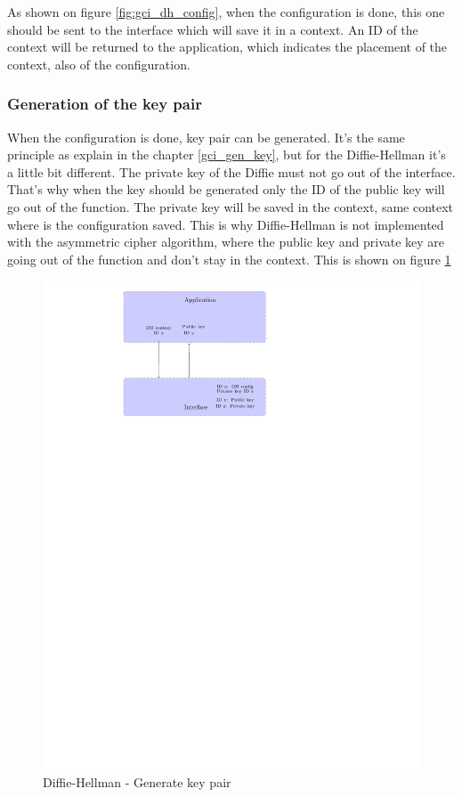 As shown on figure \ref{fig:gci_dh_config}, when the configuration is done, this
one should be sent to the interface which will save it in a context.
An ID of the context will be returned to the application, which indicates the
placement of the context, also of the configuration.


\subsubsection*{Generation of the key pair}

When the configuration is done, key pair can be generated. It's the same
principle as explain in the chapter \ref{gci_gen_key}, but for the
Diffie-Hellman it's a little bit different. The private key of the Diffie must not go out of the
interface. That's why when the key should be generated only the ID of the public
key will go out of the function. The private key will be saved in the
context, same context where is the configuration saved. This is why
Diffie-Hellman is not implemented with the asymmetric cipher algorithm, where
the public key and private key are going out of the function and don't stay in
the context. This is shown on figure \ref{fig:gci_dh_gen_key}

\begin{figure}[!ht]
\centering
\includegraphics[trim=8.5cm 20cm 10cm 0cm]{figures/gci_dh_gen_key.pdf}
\caption{Diffie-Hellman - Generate key pair\newline}
\label{fig:gci_dh_gen_key}
\end{figure}


